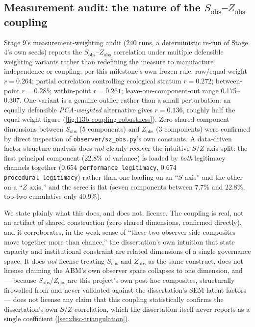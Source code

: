 \subsection{\texorpdfstring{Measurement audit: the nature of the $S_{\text{obs}}$--$Z_{\text{obs}}$ coupling}{Measurement audit: the nature of the S\_obs--Z\_obs coupling}}
\label{sec:level13b-measurement}

Stage 9's measurement-weighting audit (240 runs, a deterministic re-run of
Stage 4's own seeds) reports the $S_{\text{obs}}$--$Z_{\text{obs}}$
correlation under multiple defensible weighting variants rather than
redefining the measure to manufacture independence or coupling, per this
milestone's own frozen rule: raw/equal-weight $r=0.264$; partial
correlation controlling ecological stratum $r=0.272$; between-point
$r=0.285$; within-point $r=0.261$; leave-one-component-out range
0.175--0.307. One variant is a genuine outlier rather than a small
perturbation: an equally defensible \textit{PCA-weighted} alternative
gives $r=0.136$, roughly half the equal-weight figure
(\cref{fig:l13b-coupling-robustness}). Zero shared component dimensions
between $S_{\text{obs}}$ (5 components) and $Z_{\text{obs}}$ (3 components)
were confirmed by direct inspection of \texttt{observer/sz\_obs.py}'s own
constants. A data-driven factor-structure analysis does \textit{not}
cleanly recover the intuitive $S$/$Z$ axis split: the first principal
component (22.8\% of variance) is loaded by \textit{both} legitimacy
channels together (0.654 \texttt{performance\_legitimacy}, 0.674
\texttt{procedural\_legitimacy}) rather than one loading on an ``$S$
axis'' and the other on a ``$Z$ axis,'' and the scree is flat (seven
components between 7.7\% and 22.8\%, top-two cumulative only 40.9\%).

We state plainly what this does, and does not, license. The coupling is
real, not an artifact of shared construction (zero shared dimensions,
confirmed directly), and it corroborates, in the weak sense of ``these two
observer-side composites move together more than chance,'' the
dissertation's own intuition that state capacity and institutional
constraint are related dimensions of a single governance space. It does
\textit{not} license treating $S_{\text{obs}}$ and $Z_{\text{obs}}$ as the
same construct, does not license claiming the ABM's own observer space
collapses to one dimension, and --- because $S_{\text{obs}}$/$Z_{\text{obs}}$
are this project's own post hoc composites, structurally firewalled from
and never validated against the dissertation's SEM latent factors ---
does not license any claim that this coupling statistically confirms the
dissertation's own $S$/$Z$ correlation, which the dissertation itself never
reports as a single coefficient (\cref{sec:disc-triangulation}).

